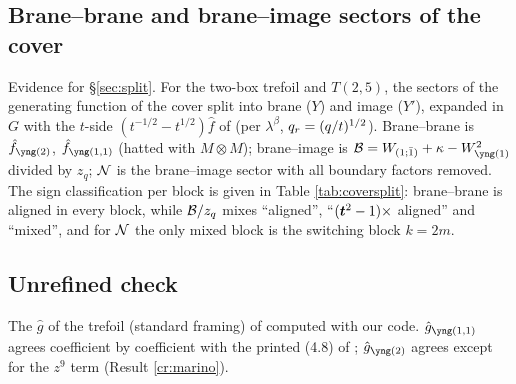 \subsection{Brane--brane and brane--image sectors of the cover}\label{app:cover}
Evidence for \S\ref{sec:split}. For the two-box trefoil and $T(2,5)$, the sectors of the generating function of the cover split into brane ($Y$) and image ($Y'$), expanded in $G$ with the $t$-side $(t^{-1/2} - t^{1/2})\hat f$ of \cite{KN17} (per $\lambda^\beta$, $q_r = (q/t)^{1/2}$). Brane--brane is $\hat f_{\ytwo}$, $\hat f_{\yoneone}$ (hatted with $M \otimes M$); brane--image is $\Bim = W_{(1;\bar1)} + \kappa - W_{\yone}^2$ divided by $z_q$; $\mathcal{N}$ is the brane--image sector with all boundary factors removed. The sign classification per block is given in Table \ref{tab:coversplit}: brane--brane is aligned in every block, while $\mathcal{B}/z_q$ mixes ``aligned'', ``$(\bm{t}^2 - 1)\times$ aligned'' and ``mixed'', and for $\mathcal{N}$ the only mixed block is the switching block $k = 2m$.
\begin{table}[t]
\caption{Signs of the $G$-expansion per $\lambda^\beta$ block for the sectors of the cover.}\label{tab:coversplit}

\end{table}

\medskip\noindent


\subsection{Unrefined check}\label{app:unref}
The $\hat g$ of the trefoil (standard framing) of \cite{Marino09} computed with our code. $\hat g_{\yoneone}$ agrees coefficient by coefficient with the printed (4.8) of \cite{Marino09}; $\hat g_{\ytwo}$ agrees except for the $z^9$ term (Result \ref{cr:marino}).

\medskip\noindent

